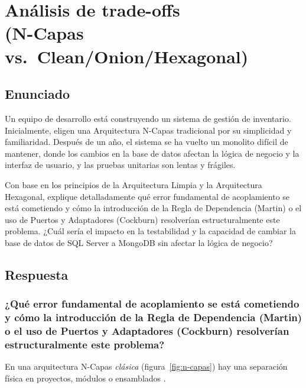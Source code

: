 \section[Análisis de trade-offs]{Análisis de trade-offs\\(N-Capas vs.\ Clean/Onion/Hexagonal)}

\subsection{Enunciado}
Un equipo de desarrollo está construyendo un sistema de gestión de inventario. Inicialmente,
eligen una Arquitectura N-Capas tradicional por su simplicidad y familiaridad. Después de un
año, el sistema se ha vuelto un monolito difícil de mantener, donde los cambios en la base de
datos afectan la lógica de negocio y la interfaz de usuario, y las pruebas unitarias son lentas
y frágiles.

Con base en los principios de la Arquitectura Limpia y la Arquitectura Hexagonal, explique
detalladamente qué error fundamental de acoplamiento se está cometiendo y cómo la introducción
de la Regla de Dependencia (Martin) o el uso de Puertos y Adaptadores (Cockburn) resolverían
estructuralmente este problema. ¿Cuál sería el impacto en la testabilidad y la capacidad de
cambiar la base de datos de SQL Server a MongoDB sin afectar la lógica de negocio?

\subsection{Respuesta}

\subsubsection{¿Qué error fundamental de acoplamiento se está cometiendo y cómo la introducción de la Regla de Dependencia (Martin) o el uso de Puertos y Adaptadores (Cockburn) resolverían estructuralmente este problema?}

En una arquitectura N-Capas \emph{clásica} (figura~\ref{fig:n-capas}) hay una separación física
en proyectos, módulos o ensamblados .

